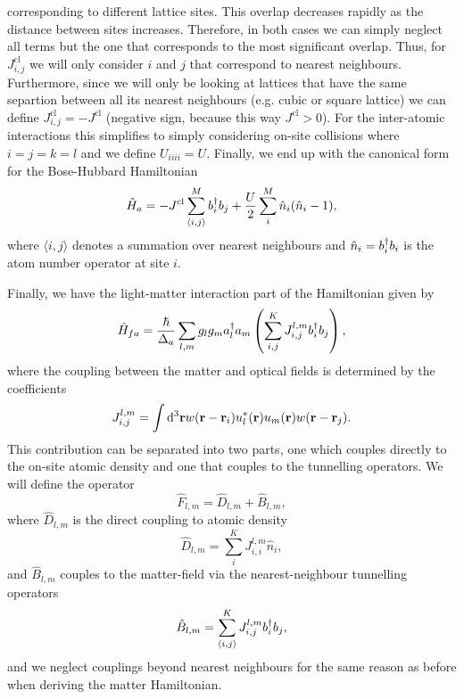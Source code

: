 corresponding to different lattice sites. This overlap decreases
rapidly as the distance between sites increases. Therefore, in both
cases we can simply neglect all terms but the one that corresponds to
the most significant overlap. Thus, for $J_{i,j}^\mathrm{cl}$ we will
only consider $i$ and $j$ that correspond to nearest neighbours.
Furthermore, since we will only be looking at lattices that have the
same separtion between all its nearest neighbours (e.g. cubic or
square lattice) we can define $J_{i,j}^\mathrm{cl} = - J^\mathrm{cl}$
(negative sign, because this way $J^\mathrm{cl} > 0$). For the
inter-atomic interactions this simplifies to simply considering
on-site collisions where $i=j=k=l$ and we define $U_{iiii} =
U$. Finally, we end up with the canonical form for the Bose-Hubbard
Hamiltonian
\begin{equation}
  \hat{H}_a = -J^\mathrm{cl} \sum_{\langle i,j \rangle}^M b^\dagger_i b_j + 
  \frac{U}{2} \sum_{i}^M \hat{n}_i (\hat{n}_i - 1),
\end{equation}
where $\langle i,j \rangle$ denotes a summation over nearest
neighbours and $\hat{n}_i = b^\dagger_i b_i$ is the atom number operator at
site $i$.

Finally, we have the light-matter interaction part of the Hamiltonian
given by
\begin{equation}
  \hat{H}_{fa} = \frac{\hbar}{\Delta_a} \sum_{l,m} g_l g_m a^\dagger_l a_m
  \left( \sum_{i,j}^K J^{l,m}_{i,j} b^\dagger_i b_j \right),
\end{equation}
where the coupling between the matter and optical fields is determined
by the coefficients
\begin{equation}
  J^{l,m}_{i,j} = \int \mathrm{d}^3 \mathbf{r} w(\mathbf{r} - \mathbf{r}_i)
  u_l^*(\mathbf{r}) u_m(\mathbf{r}) w(\mathbf{r} - \mathbf{r}_j).
\end{equation}
This contribution can be separated into two parts, one which couples
directly to the on-site atomic density and one that couples to the
tunnelling operators. We will define the operator
\begin{equation}
  \hat{F}_{l,m} = \hat{D}_{l,m} + \hat{B}_{l,m},
\end{equation}
where $\hat{D}_{l,m}$ is the direct coupling to atomic density
\begin{equation}
  \hat{D}_{l,m} = \sum_{i}^K J^{l,m}_{i,i} \hat{n}_i,
\end{equation}
and $\hat{B}_{l,m}$ couples to the matter-field via the
nearest-neighbour tunnelling operators
\begin{equation}
  \hat{B}_{l,m} = \sum_{\langle i, j \rangle}^K J^{l,m}_{i,j} b^\dagger_i b_j,
\end{equation}
and we neglect couplings beyond nearest neighbours for the same reason
as before when deriving the matter Hamiltonian.

